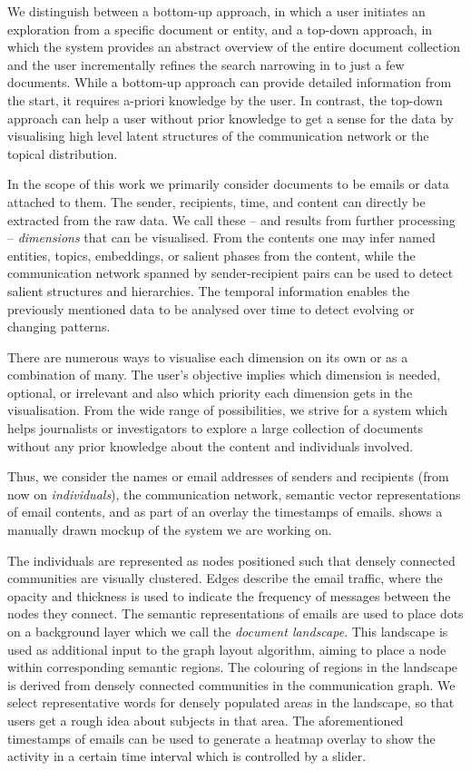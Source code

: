 We distinguish between a bottom-up approach, in which a user initiates an exploration from a specific document or entity, and a top-down approach, in which the system provides an abstract overview of the entire document collection and the user incrementally refines the search narrowing in to just a few documents.
While a bottom-up approach can provide detailed information from the start, it requires a-priori knowledge by the user.
In contrast, the top-down approach can help a user without prior knowledge to get a sense for the data by visualising high level latent structures of the communication network or the topical distribution.

In the scope of this work we primarily consider documents to be emails or data attached to them.
The sender, recipients, time, and content can directly be extracted from the raw data.
We call these -- and results from further processing -- \textit{dimensions} that can be visualised.
From the contents one may infer named entities, topics, embeddings, or salient phases from the content, while the communication network spanned by sender-recipient pairs can be used to detect salient structures and hierarchies.
The temporal information enables the previously mentioned data to be analysed over time to detect evolving or changing patterns.

There are numerous ways to visualise each dimension on its own or as a combination of many.
The user's objective implies which dimension is needed, optional, or irrelevant and also which priority each dimension gets in the visualisation.
From the wide range of possibilities, we strive for a system which helps journalists or investigators to explore a large collection of documents without any prior knowledge about the content and individuals involved.

Thus, we consider the names or email addresses of senders and recipients (from now on \textit{individuals}), the communication network, semantic vector representations of email contents, and as part of an overlay the timestamps of emails.
 shows a manually drawn mockup of the system we are working on.

The individuals are represented as nodes positioned such that densely connected communities are visually clustered.
Edges describe the email traffic, where the opacity and thickness is used to indicate the frequency of messages between the nodes they connect.
The semantic representations of emails are used to place dots on a background layer which we call the \textit{document landscape}.
This landscape is used as additional input to the graph layout algorithm, aiming to place a node within corresponding semantic regions.
The colouring of regions in the landscape is derived from densely connected communities in the communication graph.
We select representative words for densely populated areas in the landscape, so that users get a rough idea about subjects in that area.
The aforementioned timestamps of emails can be used to generate a heatmap overlay to show the activity in a certain time interval which is controlled by a slider.

